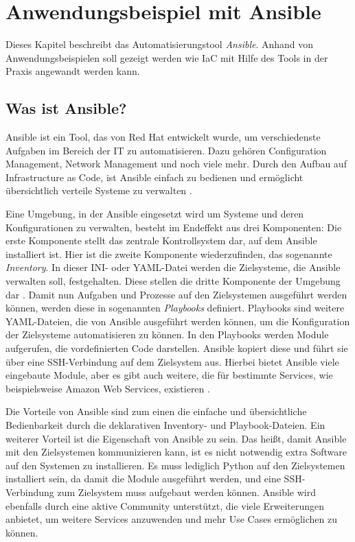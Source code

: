 \documentclass[biblatex]{lni}
\begin{document}
\section{Anwendungsbeispiel mit Ansible}
Dieses Kapitel beschreibt das Automatisierungstool \textit{Ansible}. Anhand von Anwendungsbeispielen soll gezeigt werden wie IaC mit Hilfe des Tools in der Praxis angewandt werden kann.
\subsection{Was ist Ansible?}
Ansible ist ein Tool, das von Red Hat entwickelt wurde, um verschiedenste Aufgaben im Bereich der IT zu automatisieren. Dazu gehören Configuration Management, Network Management und noch viele mehr. Durch den Aufbau auf Infrastructure as Code, ist Ansible einfach zu bedienen und ermöglicht übersichtlich verteile Systeme zu verwalten \cite{RedHat.2022}. 

Eine Umgebung, in der Ansible eingesetzt wird um Systeme und deren Konfigurationen zu verwalten, besteht im Endeffekt aus drei Komponenten: Die erste Komponente stellt das zentrale Kontrollsystem dar, auf dem Ansible installiert ist. Hier ist die zweite Komponente wiederzufinden, das sogenannte \textit{Inventory}. In dieser INI- oder YAML-Datei werden die Zielsysteme, die Ansible verwalten soll, festgehalten. Diese stellen die dritte Komponente der Umgebung dar \cite{RedHat.2022b}. Damit nun Aufgaben und Prozesse auf den Zielsystemen ausgeführt werden können, werden diese in sogenannten \textit{Playbooks} definiert. Playbooks sind weitere YAML-Dateien, die von Ansible ausgeführt werden können, um die Konfiguration der Zielsysteme automatisieren zu können. 
In den Playbooks werden Module aufgerufen, die vordefinierten Code darstellen. Ansible kopiert diese und führt sie über eine SSH-Verbindung auf dem Zielsystem aus. Hierbei bietet Ansible viele eingebaute Module, aber es gibt auch weitere, die für bestimmte Services, wie beispielsweise Amazon Web Services, existieren \cite{RedHat.2022}. 

Die Vorteile von Ansible sind zum einen die einfache und übersichtliche Bedienbarkeit durch die deklarativen Inventory- und Playbook-Dateien. Ein weiterer Vorteil ist die Eigenschaft von Ansible  zu sein. Das heißt, damit Ansible mit den Zielsystemen kommunizieren kann, ist es nicht notwendig extra Software auf den Systemen zu installieren. Es muss lediglich Python auf den Zielsystemen installiert sein, da damit die Module ausgeführt werden, und eine SSH-Verbindung zum Zielsystem muss aufgebaut werden können. Ansible wird ebenfalls durch eine aktive Community unterstützt, die viele Erweiterungen anbietet, um weitere Services anzuwenden und mehr Use Cases ermöglichen zu können. 
\end{document}
